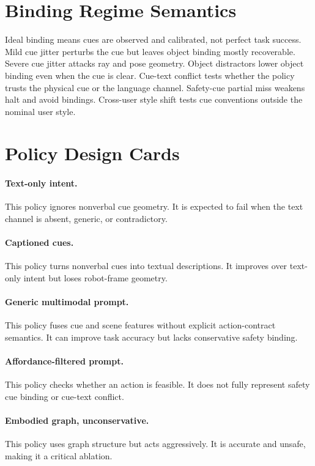 \documentclass{article}
\begin{document}
\section{Binding Regime Semantics}

Ideal binding means cues are observed and calibrated, not perfect task success. Mild cue jitter perturbs the cue but leaves object binding mostly recoverable. Severe cue jitter attacks ray and pose geometry. Object distractors lower object binding even when the cue is clear. Cue-text conflict tests whether the policy trusts the physical cue or the language channel. Safety-cue partial miss weakens halt and avoid bindings. Cross-user style shift tests cue conventions outside the nominal user style.

\section{Policy Design Cards}

\paragraph{Text-only intent.}
This policy ignores nonverbal cue geometry. It is expected to fail when the text channel is absent, generic, or contradictory.

\paragraph{Captioned cues.}
This policy turns nonverbal cues into textual descriptions. It improves over text-only intent but loses robot-frame geometry.

\paragraph{Generic multimodal prompt.}
This policy fuses cue and scene features without explicit action-contract semantics. It can improve task accuracy but lacks conservative safety binding.

\paragraph{Affordance-filtered prompt.}
This policy checks whether an action is feasible. It does not fully represent safety cue binding or cue-text conflict.

\paragraph{Embodied graph, unconservative.}
This policy uses graph structure but acts aggressively. It is accurate and unsafe, making it a critical ablation.
\end{document}
